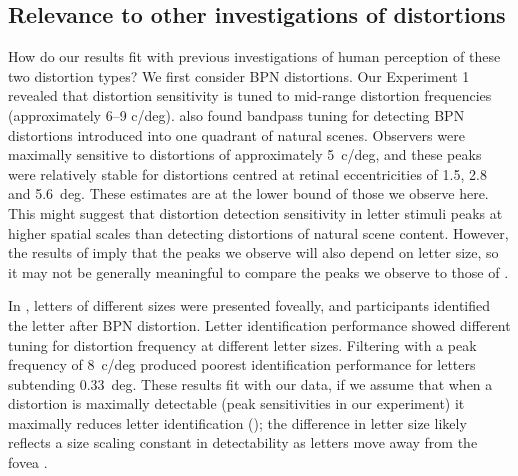 \documentclass[doc, 11pt,a4paper,natbib]{apa6}\usepackage[]{graphicx}\usepackage[]{color}
\begin{document}
\subsection{Relevance to other investigations of distortions}

How do our results fit with previous investigations of human perception of these two distortion types?
We first consider BPN distortions.
Our Experiment 1 revealed that distortion sensitivity is tuned to mid-range distortion frequencies (approximately 6--9 c/deg).
\citet{bex_sensitivity_2010} also found bandpass tuning for detecting BPN distortions introduced into one quadrant of natural scenes.
Observers were maximally sensitive to distortions of approximately 5~c/deg, and these peaks were relatively stable for distortions centred at retinal eccentricities of 1.5, 2.8 and 5.6~deg.
These estimates are at the lower bound of those we observe here.
This might suggest that distortion detection sensitivity in letter stimuli peaks at higher spatial scales than detecting distortions of natural scene content.
However, the results of \citet{wiecek_metamorphopsia_2014} imply that the peaks we observe will also depend on letter size, so it may not be generally meaningful to compare the peaks we observe to those of \citet{bex_sensitivity_2010}.

In \citet{wiecek_metamorphopsia_2014}, letters of different sizes were presented foveally, and participants identified the letter after BPN distortion.
Letter identification performance showed different tuning for distortion frequency at different letter sizes.
Filtering with a peak frequency of 8~c/deg produced poorest identification performance for letters subtending 0.33~deg.
These results fit with our data, if we assume that when a distortion is maximally detectable (peak sensitivities in our experiment) it maximally reduces letter identification (\citet{wiecek_metamorphopsia_2014}); the difference in letter size likely reflects a size scaling constant in detectability as letters move away from the fovea \citep{chung_spatialfrequency_2002, song_double_2014}.
\end{document}
